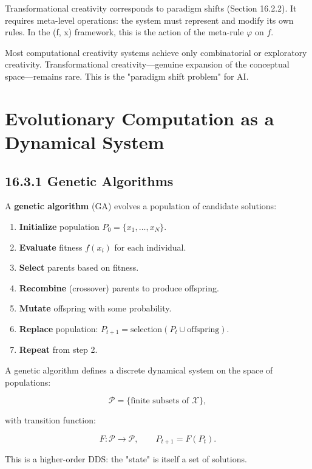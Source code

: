 \begin{proposition}
Transformational creativity corresponds to paradigm shifts (Section 16.2.2). It requires meta-level operations: the system must represent and modify its own rules. In the (f, x) framework, this is the action of the meta-rule $\varphi$ on $f$.
\end{proposition}

\begin{observation}
Most computational creativity systems achieve only combinatorial or exploratory creativity. Transformational creativity---genuine expansion of the conceptual space---remains rare. This is the "paradigm shift problem" for AI.
\end{observation}



\section{Evolutionary Computation as a Dynamical System}

\subsection{16.3.1 Genetic Algorithms}

A \textbf{genetic algorithm} (GA) evolves a population of candidate solutions:

\begin{enumerate}
\item \textbf{Initialize} population $P_0 = \{x_1, \ldots, x_N\}$.
\item \textbf{Evaluate} fitness $f(x_i)$ for each individual.
\item \textbf{Select} parents based on fitness.
\item \textbf{Recombine} (crossover) parents to produce offspring.
\item \textbf{Mutate} offspring with some probability.
\item \textbf{Replace} population: $P_{t+1} = \text{selection}(P_t \cup \text{offspring})$.
\item \textbf{Repeat} from step 2.
\end{enumerate}

\begin{definition}[GA as DDS]
A genetic algorithm defines a discrete dynamical system on the space of populations:

\[\mathcal{P} = \{\text{finite subsets of } \mathcal{X}\},\]

with transition function:

\[F: \mathcal{P} \to \mathcal{P}, \qquad P_{t+1} = F(P_t).\]

This is a higher-order DDS: the "state" is itself a set of solutions.
\end{definition}

